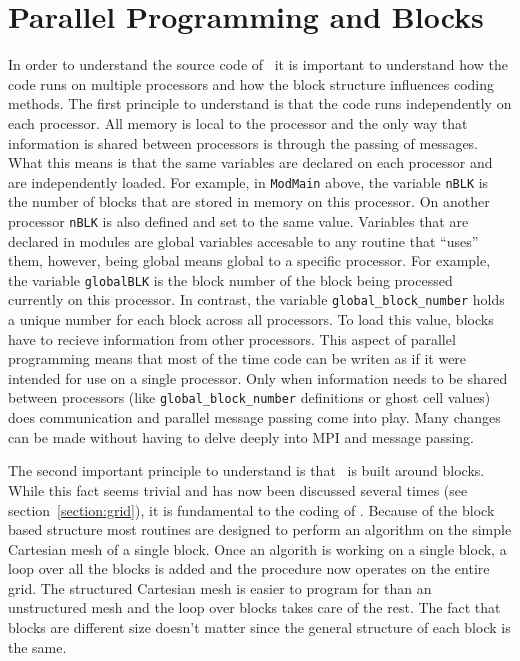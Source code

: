 \section{Parallel Programming and Blocks \label{section:parallel_programming}}

In order to understand the source code of \BATSRUS\
it is important to understand how the code runs on
multiple processors and how the block structure influences
coding methods.  The first principle to understand is
that the code runs independently on each processor.  All memory
is local to the processor and the only way that information is
shared between processors is through the passing of messages.
What this means is that the same variables are declared on each
processor and are independently loaded.  For example, in 
{\tt ModMain} above, the variable {\tt nBLK} is the number of
blocks that are stored in memory on this processor.  On another
processor {\tt nBLK} is also defined and set to the same value.
Variables that are declared in modules are global variables 
accesable to any routine that ``uses'' them, however, being
global means global to a specific processor.  For example,
the variable {\tt globalBLK} is the block number of the 
block being processed currently on this processor.  In contrast,
the variable {\tt global\_block\_number} holds a unique number for
each block across all processors.  To
load this value, blocks have to recieve information from other
processors.  This aspect of parallel programming means that 
most of the time code can be writen as if it were intended
for use on a single processor.  Only when information needs to
be shared between processors (like
{\tt global\_block\_number} definitions or ghost cell values) does 
communication and parallel message passing come into play.
Many changes can be made without having to 
delve deeply into MPI and message passing.

The second important principle to understand is that \BATSRUS\
is built around blocks.  While this fact seems trivial
and has now been discussed several times (see section~\ref{section:grid}),
it is fundamental to the coding of \BATSRUS.  Because of the block 
based structure most routines are designed to perform an algorithm
on the simple Cartesian mesh of a single block.  Once an algorith is
 working on a single block, a loop over all the blocks is added and the
procedure now operates on the entire grid.  The structured
Cartesian mesh is easier to program for than an unstructured
mesh and the loop over blocks takes care of the rest.  The
fact that blocks are different size doesn't matter since the
general structure of each block is the same.


